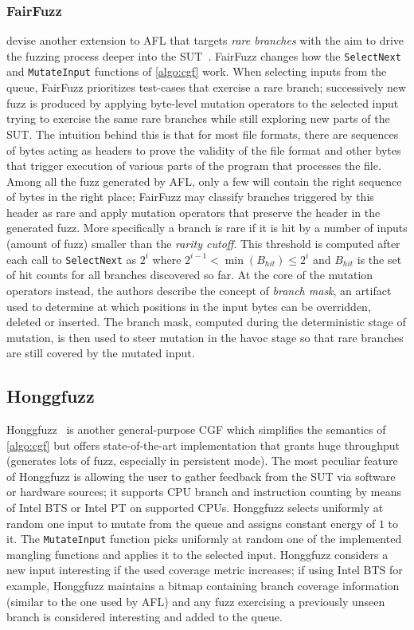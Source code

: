 \subsubsection{FairFuzz}
\citeauthor{lemieux2017fairfuzz} devise another extension to AFL that targets
\emph{rare branches} with the aim to drive the fuzzing process deeper into the
\ac{SUT}~\cite{lemieux2017fairfuzz}. FairFuzz changes how the
\texttt{SelectNext} and \texttt{MutateInput} functions of
\autoref{algo:cgf} work. When selecting inputs from the queue, FairFuzz
prioritizes test-cases that exercise a rare branch; successively new fuzz is
produced by applying byte-level mutation operators to the selected input trying
to exercise the same rare branches while still exploring new parts of the
\ac{SUT}. The intuition behind this is that for most file formats, there are
sequences of bytes acting as headers to prove the validity of the file format
and other bytes that trigger execution of various parts of the program that
processes the file. Among all the fuzz generated by AFL, only a few will contain
the right sequence of bytes in the right place; FairFuzz may classify branches
triggered by this header as rare and apply mutation operators that preserve the
header in the generated fuzz. More specifically a branch is rare if it is hit by
a number of inputs (amount of fuzz) smaller than the \emph{rarity cutoff}. This
threshold is computed after each call to \texttt{SelectNext} as $2^i$ where
$2^{i-1} < \min(B_{hit}) \le 2^i$ and $B_{hit}$ is the set of hit counts for all
branches discovered so far. At the core of the mutation operators instead, the
authors describe the concept of \emph{branch mask}, an artifact used to
determine at which positions in the input bytes can be overridden, deleted or
inserted. The branch mask, computed during the deterministic stage of mutation,
is then used to steer mutation in the havoc stage so that rare branches are
still covered by the mutated input.

\subsection{Honggfuzz}
Honggfuzz~\cite{honggfuzz} is another general-purpose \ac{CGF} which simplifies
the semantics of \autoref{algo:cgf} but offers state-of-the-art
implementation that grants huge throughput (generates lots of fuzz, especially
in persistent mode). The most peculiar feature of Honggfuzz is allowing the user
to gather feedback from the \ac{SUT} via software or hardware sources; it
supports CPU branch and instruction counting by means of Intel \ac{BTS} or Intel
\ac{PT} on supported CPUs. Honggfuzz selects uniformly at random one input to
mutate from the queue and assigns constant energy of $1$ to it. The
\texttt{MutateInput} function picks uniformly at random one of the implemented
mangling functions and applies it to the selected input. Honggfuzz considers a
new input interesting if the used coverage metric increases; if using Intel
\ac{BTS} for example, Honggfuzz maintains a bitmap containing branch coverage
information (similar to the one used by AFL) and any fuzz exercising a
previously unseen branch is considered interesting and added to the queue.

